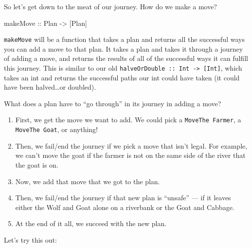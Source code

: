\documentclass[]{article}
\newenvironment{Shaded}{}{}
\newcommand{\DataTypeTok}[1]{\textcolor[rgb]{0.56,0.13,0.00}{{#1}}}
\newcommand{\OtherTok}[1]{\textcolor[rgb]{0.00,0.44,0.13}{{#1}}}
\newcommand{\NormalTok}[1]{{#1}}
\begin{document}
So let's get down to the meat of our journey. How do we make a move?

\begin{Shaded}
\begin{Highlighting}[]
\OtherTok{makeMove ::} \DataTypeTok{Plan} \OtherTok{->} \NormalTok{[}\DataTypeTok{Plan}\NormalTok{]}
\end{Highlighting}
\end{Shaded}

\texttt{makeMove} will be a function that takes a plan and returns all the
successful ways you can add a move to that plan. It takes a plan and takes it
through a journey of adding a move, and returns the results of all of the
successful ways it can fulfill this journey. This is similar to our old
\texttt{halveOrDouble\ ::\ Int\ -\textgreater{}\ {[}Int{]}}, which takes an int
and returns the successful paths our int could have taken (it could have been
halved\ldots{}or doubled).

What does a plan have to ``go through'' in its journey in adding a move?

\begin{enumerate}
\def\labelenumi{\arabic{enumi}.}
\tightlist
\item
  First, we get the move we want to add. We could pick a
  \texttt{MoveThe\ Farmer}, a \texttt{MoveThe\ Goat}, or anything!
\item
  Then, we fail/end the journey if we pick a move that isn't legal. For example,
  we can't move the goat if the farmer is not on the same side of the river that
  the goat is on.
\item
  Now, we add that move that we got to the plan.
\item
  Then, we fail/end the journey if that new plan is ``unsafe'' --- if it leaves
  either the Wolf and Goat alone on a riverbank or the Goat and Cabbage.
\item
  At the end of it all, we succeed with the new plan.
\end{enumerate}

Let's try this out:
\end{document}
